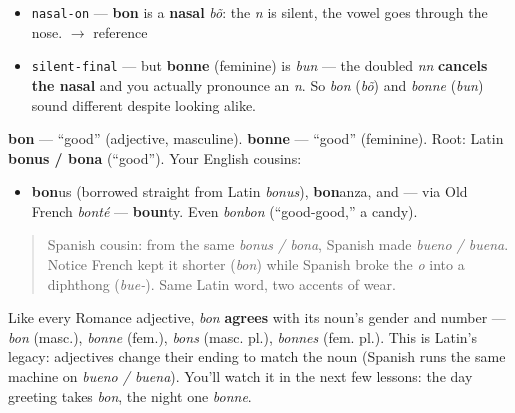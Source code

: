 \begin{sounds}
\begin{itemize}
\raggedright
  \item \texttt{nasal-on} — \textbf{bon} is a \textbf{nasal} \emph{bõ}: the \emph{n} is silent, the vowel goes through the nose. $\to$ reference
  \item \texttt{silent-final} — but \textbf{bonne} (feminine) is \emph{bun} — the doubled \emph{nn} \textbf{cancels the nasal} and you actually pronounce an \emph{n}. So \emph{bon} (\emph{bõ}) and \emph{bonne} (\emph{bun}) sound different despite looking alike.
\end{itemize}
\end{sounds}

\begin{cousinweb}
\textbf{bon} — \textquotedblleft{}good\textquotedblright{} (adjective, masculine). \textbf{bonne} — \textquotedblleft{}good\textquotedblright{} (feminine). Root: Latin \textbf{bonus / bona} (\textquotedblleft{}good\textquotedblright{}). Your English cousins:

\begin{itemize}
\raggedright
  \item \textbf{bon}us (borrowed straight from Latin \emph{bonus}), \textbf{bon}anza, and — via Old French \emph{bonté} — \textbf{boun}ty. Even \emph{bonbon} (\textquotedblleft{}good-good,\textquotedblright{} a candy).
\end{itemize}

\begin{quote}
Spanish cousin: from the same \emph{bonus / bona}, Spanish made \emph{bueno / buena}. Notice French kept it shorter (\emph{bon}) while Spanish broke the \emph{o} into a diphthong (\emph{bue-}). Same Latin word, two accents of wear.
\end{quote}
\end{cousinweb}

\begin{grammarlens}[title={Grammar Lens: adjectives agree with their noun}]
Like every Romance adjective, \emph{bon} \textbf{agrees} with its noun's gender and number — \emph{bon} (masc.), \emph{bonne} (fem.), \emph{bons} (masc. pl.), \emph{bonnes} (fem. pl.). This is Latin's legacy: adjectives change their ending to match the noun (Spanish runs the same machine on \emph{bueno / buena}). You'll watch it in the next few lessons: the day greeting takes \emph{bon}, the night one \emph{bonne}.
\end{grammarlens}

